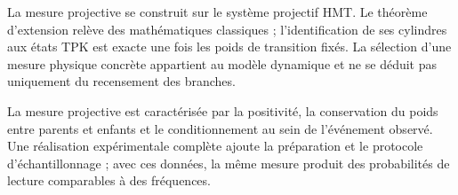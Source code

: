 \begin{statusbox}
La mesure projective se construit sur le système projectif HMT.
Le théorème d'extension relève des mathématiques classiques ; l'identification de ses
cylindres aux états TPK est exacte une fois les poids de transition fixés.
La sélection d'une mesure physique concrète appartient au modèle dynamique et ne
se déduit pas uniquement du recensement des branches.
\end{statusbox}

La mesure projective est caractérisée par la positivité, la conservation du
poids entre parents et enfants et le conditionnement au sein de l'événement observé. Une
réalisation expérimentale complète ajoute la préparation et le protocole
d'échantillonnage ; avec ces données, la même mesure produit des probabilités de lecture
comparables à des fréquences.
